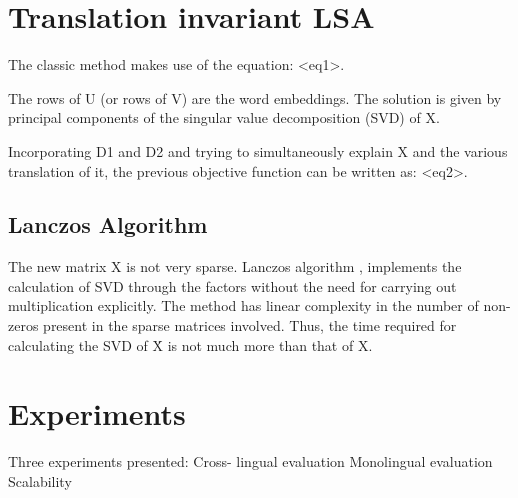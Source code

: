 \documentclass[11pt]{article}
\begin{document}
\section{Translation invariant LSA}
The classic method makes use of the equation: <eq1>.

The rows of U (or rows of V) are the word embeddings.
The solution is given by principal components of the singular value decomposition (SVD) of X.

Incorporating D1 and D2 and trying to simultaneously explain X and the various translation of it, the previous objective function can be written as: <eq2>.

\subsection{Lanczos Algorithm}
The new matrix X is not very sparse.
Lanczos algorithm \cite{van1996matrix}, implements the calculation of SVD through the factors without the need for carrying out multiplication explicitly.
The method has linear complexity in the number of non-zeros present in the sparse matrices involved.
Thus, the time required for calculating the SVD of Ẋ is not much more than that of X.

\section{Experiments}
Three experiments presented:
Cross- lingual evaluation
Monolingual evaluation
Scalability





\end{document}
